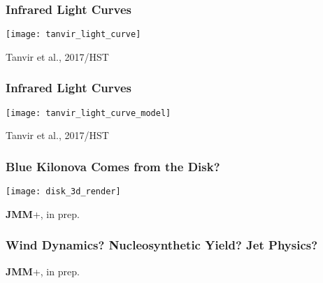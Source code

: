 \documentclass[]{beamer}
\begin{document}
\begin{frame}
  \frametitle{Infrared Light Curves}
  \begin{center}
    \texttt{[image: tanvir\_light\_curve]}
  \end{center}
  Tanvir et al., 2017/HST
\end{frame}

\begin{frame}
  \frametitle{Infrared Light Curves}
  \begin{center}
    \texttt{[image: tanvir\_light\_curve\_model]}
  \end{center}
  Tanvir et al., 2017/HST
\end{frame}

\begin{frame}
  \frametitle{Blue Kilonova Comes from the Disk?}
  \begin{center}
    \texttt{[image: disk\_3d\_render]}
  \end{center}
  \textbf{JMM}+, in prep.
\end{frame}

\begin{frame}
  \frametitle{Wind Dynamics? Nucleosynthetic Yield? Jet Physics?}
  \begin{center}
  \end{center}
    \textbf{JMM}+, in prep.
\end{frame}
\end{document}

